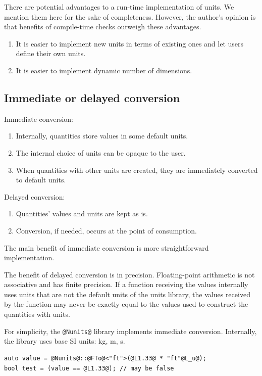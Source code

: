 \documentclass[11pt,letterpaper]{article}
\makeatletter
\newcommand{\lib}{\lstinline{@Nunits@} library}
\makeatother
\begin{document}
There are potential advantages to a run-time implementation of units.
We mention them here for the sake of completeness.
However, the author's opinion is that benefits of compile-time checks outweigh these advantages.
\begin{enumerate}
    \item It is easier to implement new units in terms of existing ones and let users
        define their own units.
    \item It is easier to implement dynamic number of dimensions.
\end{enumerate}

\subsection{Immediate or delayed conversion} %

Immediate conversion:
\begin{enumerate}
    \item Internally, quantities store values in some default units.
    \item The internal choice of units can be opaque to the user.
    \item When quantities with other units are created, they are immediately converted to
      default units.
\end{enumerate}

Delayed conversion:
\begin{enumerate}
    \item Quantities' values and units are kept as is.
    \item Conversion, if needed, occurs at the point of consumption.
\end{enumerate}

The main benefit of immediate conversion is more straightforward implementation.

The benefit of delayed conversion is in precision.
Floating-point arithmetic is not associative and has finite precision.
%
If a function receiving the values internally uses units that are not the default units of the
units library, the values received by the function may never be
exactly equal to the values used to construct the quantities with units.

For simplicity, the \lib{} implements immediate conversion.
Internally, the library uses base SI units: kg, m, s.
%
\begin{lstlisting}
auto value = @Nunits@::@FTo@<"ft">(@L1.33@ * "ft"@L_u@);
bool test = (value == @L1.33@); // may be false
\end{lstlisting}
\end{document}
